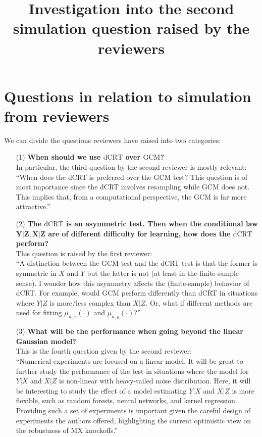 \documentclass{article}
\title{Investigation into the second simulation question raised by the reviewers}
\begin{document}
\maketitle

\begin{abstract}
  
\end{abstract}




\section{Questions in relation to simulation from reviewers}

We can divide the questions reviewers have raised into two categories:
\begin{enumerate}
	\item[(1)]\textbf{When should we use $\mathrm{dCRT}$ over $\mathrm{GCM}$?}\\ 
	In particular, the third question by the second reviewer is mostly relevant:\\
	``When does the dCRT is preferred over the GCM test? This question is of most importance 
	since the dCRT involves resampling while GCM does not. This implies that, from a 
	computational perspective, the GCM is far more attractive.''
	\item[(2)] \textbf{The $\mathrm{dCRT}$ is an asymmetric test. Then when the conditional law $\bm Y|\bm Z,\bm X|\bm Z$ are of different difficulty for learning, how does the $\mathrm{dCRT}$ perform?}\\
	This question is raised by the first reviewer:\\
	``A distinction between the GCM test and the dCRT test is that the former is
	symmetric in $X$ and $Y$ but the latter is not (at least in the finite-sample sense).
	I wonder how this asymmetry affects the (finite-sample) behavior of dCRT. For
	example, would GCM perform differently than dCRT in situations where $Y|Z$
	is more/less complex than $X|Z$. Or, what if different methods are used for
	fitting $\mu_{n,x}(\cdot)$ and $\mu_{n,y}(\cdot)$?''
	\item[(3)] \textbf{What will be the performance when going beyond the linear Gaussian model?}\\
	This is the fourth question given by the second reviewer:\\
	``Numerical experiments are focused on a linear model. It will be great to further study the 
	performance of the test in situations where the model for $Y|X$ and $X|Z$ is non-linear with 
	heavy-tailed noise distribution. Here, it will be interesting to study the effect of a model 
	estimating $Y|X$ and $X|Z$ is more flexible, such as random forests, neural networks, and 
	kernel regression. Providing such a set of experiments is important given the careful design 
	of  experiments  the  authors  offered,  highlighting  the  current  optimistic  view  on  the 
	robustness of MX knockoffs.''
\end{enumerate}
\end{document}
